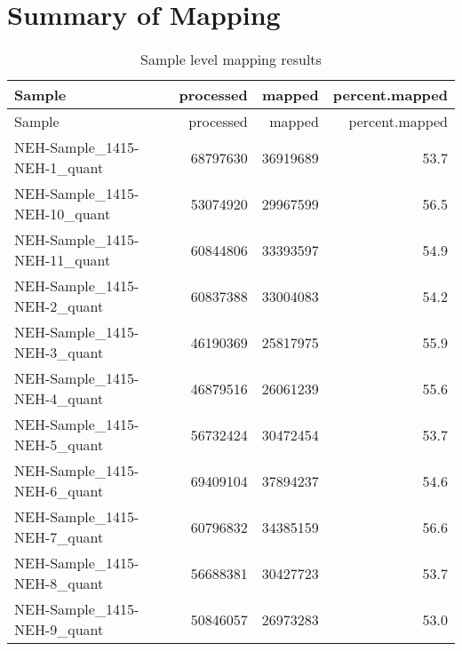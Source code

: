 \documentclass[]{article}
\newenvironment{Shaded}{\begin{snugshade}}{\end{snugshade}}
\newcommand{\DataTypeTok}[1]{\textcolor[rgb]{0.13,0.29,0.53}{#1}}
\newcommand{\KeywordTok}[1]{\textcolor[rgb]{0.13,0.29,0.53}{\textbf{#1}}}
\newcommand{\NormalTok}[1]{#1}
\newcommand{\OperatorTok}[1]{\textcolor[rgb]{0.81,0.36,0.00}{\textbf{#1}}}
\newcommand{\StringTok}[1]{\textcolor[rgb]{0.31,0.60,0.02}{#1}}
\begin{document}
\hypertarget{summary-of-mapping}{%
\section{Summary of Mapping}\label{summary-of-mapping}}

\begin{Shaded}
\end{Shaded}

\begin{longtable}[]{@{}lrrr@{}}
\caption{Sample level mapping results}\tabularnewline
\toprule
Sample & processed & mapped & percent.mapped\tabularnewline
\midrule
\endfirsthead
\toprule
Sample & processed & mapped & percent.mapped\tabularnewline
\midrule
\endhead
NEH-Sample\_1415-NEH-1\_quant & 68797630 & 36919689 &
53.7\tabularnewline
NEH-Sample\_1415-NEH-10\_quant & 53074920 & 29967599 &
56.5\tabularnewline
NEH-Sample\_1415-NEH-11\_quant & 60844806 & 33393597 &
54.9\tabularnewline
NEH-Sample\_1415-NEH-2\_quant & 60837388 & 33004083 &
54.2\tabularnewline
NEH-Sample\_1415-NEH-3\_quant & 46190369 & 25817975 &
55.9\tabularnewline
NEH-Sample\_1415-NEH-4\_quant & 46879516 & 26061239 &
55.6\tabularnewline
NEH-Sample\_1415-NEH-5\_quant & 56732424 & 30472454 &
53.7\tabularnewline
NEH-Sample\_1415-NEH-6\_quant & 69409104 & 37894237 &
54.6\tabularnewline
NEH-Sample\_1415-NEH-7\_quant & 60796832 & 34385159 &
56.6\tabularnewline
NEH-Sample\_1415-NEH-8\_quant & 56688381 & 30427723 &
53.7\tabularnewline
NEH-Sample\_1415-NEH-9\_quant & 50846057 & 26973283 &
53.0\tabularnewline
\bottomrule
\end{longtable}
\end{document}
